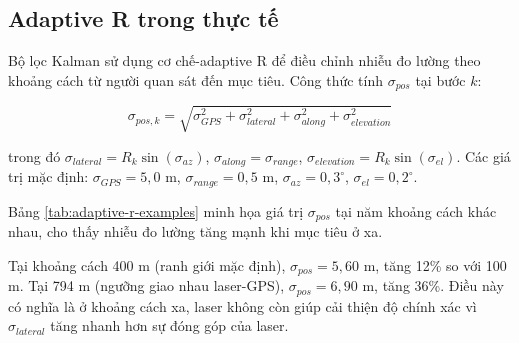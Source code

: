 \subsection{Adaptive R trong thực tế}

\hspace{0.5cm} Bộ lọc Kalman sử dụng cơ chế-adaptive R để điều chỉnh nhiễu đo lường theo khoảng cách từ người quan sát đến mục tiêu. Công thức tính $\sigma_{pos}$ tại bước $k$:

\begin{equation}
\sigma_{pos,k} = \sqrt{\sigma_{GPS}^2 + \sigma_{lateral}^2 + \sigma_{along}^2 + \sigma_{elevation}^2}
\end{equation}

trong đó $\sigma_{lateral} = R_k \sin(\sigma_{az})$, $\sigma_{along} = \sigma_{range}$, $\sigma_{elevation} = R_k \sin(\sigma_{el})$. Các giá trị mặc định: $\sigma_{GPS} = 5,0$ m, $\sigma_{range} = 0,5$ m, $\sigma_{az} = 0,3^{\circ}$, $\sigma_{el} = 0,2^{\circ}$.

Bảng \ref{tab:adaptive-r-examples} minh họa giá trị $\sigma_{pos}$ tại năm khoảng cách khác nhau, cho thấy nhiễu đo lường tăng mạnh khi mục tiêu ở xa.

\begin{table}[H]
\centering
{}
\caption{Giá trị $\sigma_{pos}$ theo khoảng cách (mặc định $\sigma_{GPS}=5,0$ m)}
\label{tab:adaptive-r-examples}
\end{table}

Tại khoảng cách 400 m (ranh giới mặc định), $\sigma_{pos} = 5,60$ m, tăng 12\% so với 100 m. Tại 794 m (ngưỡng giao nhau laser-GPS), $\sigma_{pos} = 6,90$ m, tăng 36\%. Điều này có nghĩa là ở khoảng cách xa, laser không còn giúp cải thiện độ chính xác vì $\sigma_{lateral}$ tăng nhanh hơn sự đóng góp của laser.

